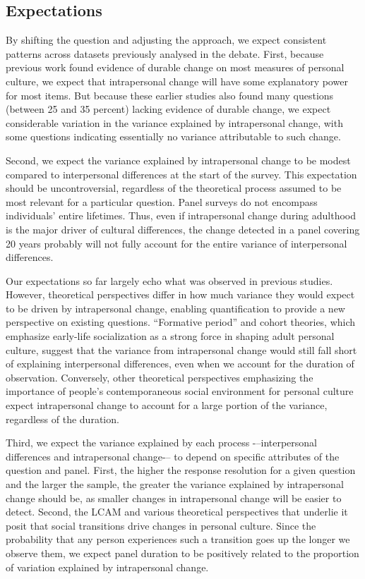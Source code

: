 \documentclass[
  12pt,
]{article}
\begin{document}
\hypertarget{expectations}{%
\subsection{Expectations}\label{expectations}}

By shifting the question and adjusting the approach, we expect
consistent patterns across datasets previously analysed in the debate.
First, because previous work found evidence of durable change on most
measures of personal culture, we expect that intrapersonal change will
have some explanatory power for most items. But because these earlier
studies also found many questions (between 25 and 35 percent) lacking
evidence of durable change, we expect considerable variation in the
variance explained by intrapersonal change, with some questions
indicating essentially no variance attributable to such change.

Second, we expect the variance explained by intrapersonal change to be
modest compared to interpersonal differences at the start of the survey.
This expectation should be uncontroversial, regardless of the
theoretical process assumed to be most relevant for a particular
question. Panel surveys do not encompass individuals' entire lifetimes.
Thus, even if intrapersonal change during adulthood is the major driver
of cultural differences, the change detected in a panel covering 20
years probably will not fully account for the entire variance of
interpersonal differences.

Our expectations so far largely echo what was observed in previous
studies. However, theoretical perspectives differ in how much variance
they would expect to be driven by intrapersonal change, enabling
quantification to provide a new perspective on existing questions.
``Formative period'' and cohort theories, which emphasize early-life
socialization as a strong force in shaping adult personal culture,
suggest that the variance from intrapersonal change would still fall
short of explaining interpersonal differences, even when we account for
the duration of observation. Conversely, other theoretical perspectives
emphasizing the importance of people's contemporaneous social
environment for personal culture expect intrapersonal change to account
for a large portion of the variance, regardless of the duration.

Third, we expect the variance explained by each process
-\/--interpersonal differences and intrapersonal change-\/-- to depend
on specific attributes of the question and panel. First, the higher the
response resolution for a given question and the larger the sample, the
greater the variance explained by intrapersonal change should be, as
smaller changes in intrapersonal change will be easier to detect.
Second, the LCAM and various theoretical perspectives that underlie it
posit that social transitions drive changes in personal culture. Since
the probability that any person experiences such a transition goes up
the longer we observe them, we expect panel duration to be positively
related to the proportion of variation explained by intrapersonal
change.
\end{document}
